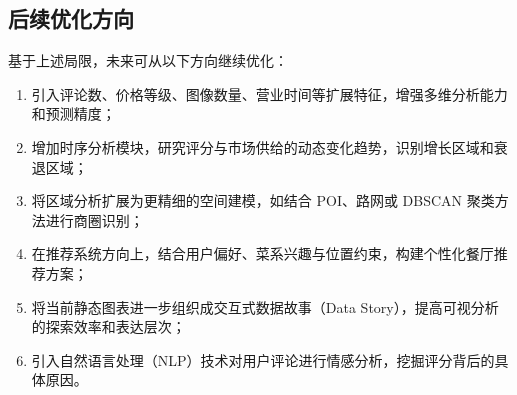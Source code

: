 \documentclass[11pt,a4paper]{article}
\begin{document}
\subsection{后续优化方向}

基于上述局限，未来可从以下方向继续优化：

\begin{enumerate}[leftmargin=2em]
    \item 引入评论数、价格等级、图像数量、营业时间等扩展特征，增强多维分析能力和预测精度；
    \item 增加时序分析模块，研究评分与市场供给的动态变化趋势，识别增长区域和衰退区域；
    \item 将区域分析扩展为更精细的空间建模，如结合 POI、路网或 DBSCAN 聚类方法进行商圈识别；
    \item 在推荐系统方向上，结合用户偏好、菜系兴趣与位置约束，构建个性化餐厅推荐方案；
    \item 将当前静态图表进一步组织成交互式数据故事（Data Story），提高可视分析的探索效率和表达层次；
    \item 引入自然语言处理（NLP）技术对用户评论进行情感分析，挖掘评分背后的具体原因。
\end{enumerate}
\end{document}
